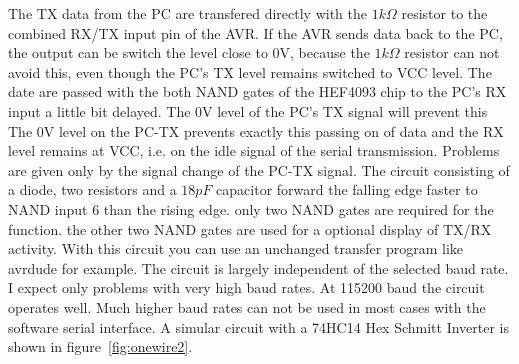The TX data from the PC are transfered directly with the \(1 k\Omega\) resistor
to the combined RX/TX input pin of the AVR.
If the AVR sends data back to the PC, the output can be switch the level close to 0V,
because the \(1k \Omega\) resistor can not avoid this, even though the
PC's TX level remains switched to VCC level.
The date are passed with the both NAND gates of the HEF4093 chip to the PC's RX input a little bit delayed.
The 0V level of the PC's TX signal will prevent this 
The 0V level on the PC-TX prevents exactly this passing on of data and the RX level remains at VCC,
i.e. on the idle signal of the serial transmission.
Problems are given only by the signal change of the PC-TX signal. 
The circuit consisting of a diode, two resistors and a \(18 pF\) capacitor forward the falling edge faster
to NAND input 6 than the rising edge.
only two NAND gates are required for the function. the other two NAND gates are used for a optional
display of TX/RX activity.
With this circuit you can use an unchanged transfer program like avrdude for example.
The circuit is largely independent of the selected baud rate.
I expect only problems with very high baud rates.
At 115200 baud the circuit operates well. Much higher baud rates can 
not be used in most cases with the software serial interface.
A simular circuit with a 74HC14 Hex Schmitt Inverter is shown in figure~\ref{fig:onewire2}. 

